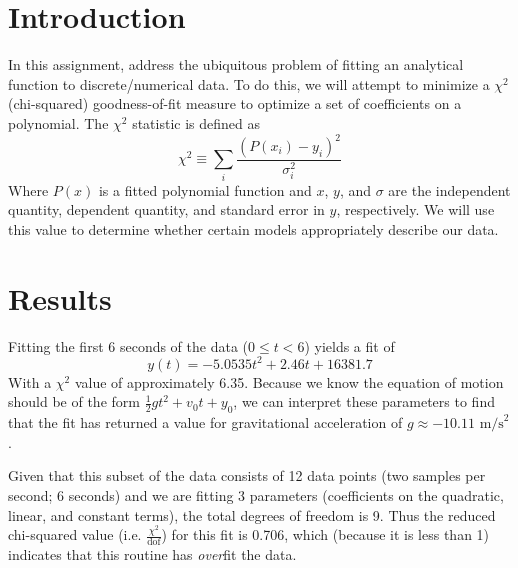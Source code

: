 \documentclass{article}
\author{\hwauthor}
\title{\hwtitle}
\date{\hwdate}
\begin{document}
\maketitle
\thispagestyle{fancy}

\section{Introduction}

In this assignment, address the ubiquitous problem of fitting an analytical function to discrete/numerical data. To do this, we will attempt to minimize a $\chi^2$ (chi-squared) goodness-of-fit measure to optimize a set of coefficients on a polynomial. The $\chi^2$ statistic is defined as \begin{equation*}
    \chi^2 \equiv \sum_i \frac{(P(x_i)-y_i)^2}{\sigma_i^2}
\end{equation*}
Where $P(x)$ is a fitted polynomial function and $x$, $y$, and $\sigma$ are the independent quantity, dependent quantity, and standard error in $y$, respectively. We will use this value to determine whether certain models appropriately describe our data.

\section{Results}

\bigskip
{}
\medskip

Fitting the first 6 seconds of the data ($0\leq t < 6$) yields a fit of \begin{equation*}
    y(t) = -5.0535t^2 + 2.46 t + 16381.7
\end{equation*}
With a $\chi^2$ value of approximately 6.35. Because we know the equation of motion should be of the form $\displaystyle \frac{1}{2}gt^2 + v_0 t + y_0$, we can interpret these parameters to find that the fit has returned a value for gravitational acceleration of $g\approx-10.11\text{ m/s}^2$.

Given that this subset of the data consists of 12 data points (two samples per second; 6 seconds) and we are fitting 3 parameters (coefficients on the quadratic, linear, and constant terms), the total degrees of freedom is 9. Thus the reduced chi-squared value (i.e. $\frac{\chi^2}{\text{dof}}$) for this fit is 0.706, which (because it is less than 1) indicates that this routine has \emph{over}fit the data.
\end{document}
